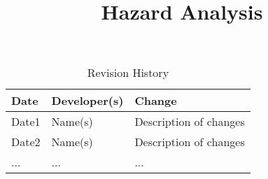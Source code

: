 \documentclass{article}
\title{Hazard Analysis\\\progname}
\author{\authname}
\date{}
\begin{document}
\begin{table}[hp]
	\caption{Revision History} \label{TblRevisionHistory}
	\begin{tabularx}{\textwidth}{llX}
		\toprule
		\textbf{Date} & \textbf{Developer(s)} & \textbf{Change}        \\
		\midrule
		Date1         & Name(s)               & Description of changes \\
		Date2         & Name(s)               & Description of changes \\
		...           & ...                   & ...                    \\
		\bottomrule
	\end{tabularx}
\end{table}

\newpage

\maketitle
\end{document}
